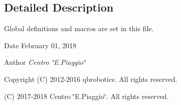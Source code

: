 \subsection{Detailed Description}
Global definitions and macros are set in this file. 

\begin{DoxyDate}{Date}
February 01, 2018 
\end{DoxyDate}
\begin{DoxyAuthor}{Author}
{\itshape Centro \char`\"{}\+E.\+Piaggio\char`\"{}} 
\end{DoxyAuthor}
\begin{DoxyCopyright}{Copyright}
(C) 2012-\/2016 qbrobotics. All rights reserved. 

(C) 2017-\/2018 Centro \char`\"{}\+E.\+Piaggio\char`\"{}. All rights reserved. 
\end{DoxyCopyright}
